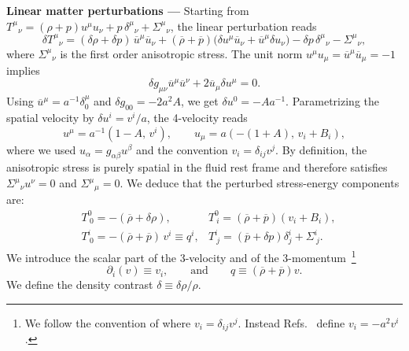 \documentclass[twocolumn,superscriptaddress,aps,preprintnumbers,amsmath,amssymb,prl,footinbib]{revtex4-2}
\begin{document}
\textbf{Linear matter perturbations ---}
Starting from
$T^\mu{}_\nu=(\rho+p)u^\mu u_\nu+p\,\delta^\mu{}_\nu+\Sigma^\mu{}_\nu$,
the linear perturbation reads~\cite{Peter:2013avv,Baumann:2022mni}
\begin{equation}
\delta T^\mu{}_\nu
=(\delta\rho+\delta p)\,\overline{u}^\mu\overline{u}_\nu
+(\overline{\rho}+\overline{p})\big(\delta u^\mu\overline{u}_\nu+\overline{u}^\mu\delta u_\nu\big)
-\delta p\,\delta^\mu{}_\nu-\Sigma^\mu{}_\nu,
\end{equation}
where $\Sigma^\mu{}_\nu$ is the first order anisotropic stress.
The unit norm $u^\mu u_\mu=\overline{u}^\mu \overline{u}_\mu=-1$ implies
\begin{equation}
\delta g_{\mu\nu}\overline{u}^\mu \overline{u}^\nu + 2\overline{u}_\mu\delta u^\mu=0.
\end{equation}
Using $\overline{u}^\mu=a^{-1}\delta^\mu_0$ and $\delta g_{00}=-2a^2A$, we get $\delta u^0=-Aa^{-1}$.
Parametrizing the spatial velocity by $\delta u^i=v^i/a$, the 4-velocity reads
\begin{equation}
u^\mu=a^{-1}(1-A,\,v^i),\qquad
u_\mu=a(-(1+A),\,v_i+B_i),
\end{equation}
where we used $u_\alpha=g_{\alpha\beta}u^\beta$ and the convention $v_i=\delta_{ij}v^j$. By definition, the anisotropic stress is purely spatial in the fluid rest
frame and therefore satisfies $\Sigma^\mu{}_\nu u^\nu=0$ and
$\Sigma^\mu{}_\mu=0$.
We deduce that the perturbed stress-energy components are:
\begin{align}
    &T^0_{\ 0} = -(\overline{\rho} + \delta\rho), &T^0_{\ i} = (\overline{\rho} + \overline{p})(v_i + B_i),  \\
   & T^i_{\ 0} = -(\overline{\rho} + \overline{p})\,v^i\equiv q^i, &T^i_{\ j} = (\overline{p} + \delta p)\delta^i_j + \Sigma^i_{\ j}.
\end{align}
We introduce the scalar part of the 3-velocity and of the 3-momentum~\footnote{We follow the convention of \cite{Peter:2013avv,Baumann:2022mni} where $v_i=\delta_{ij}v^j$. Instead Refs.~\cite{Mukhanov:1990me,Mukhanov:2005sc} define $v_i=-a^2v^i$.}
\begin{equation}
    \partial_i( v) \equiv  v_i,\qquad \textrm{and}\qquad  q\equiv (\overline{\rho}+\overline{p})v.
\end{equation}
We define the density contrast $\delta \equiv \delta \rho/\rho$.
\end{document}
